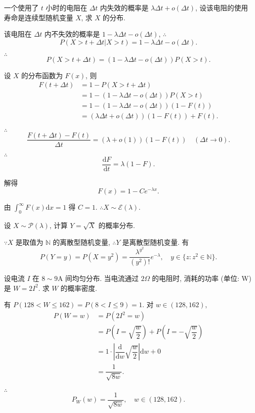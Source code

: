 \documentclass{ctexart}
\begin{document}
\addtocounter{exercise}{3}
\begin{exercise}%
    一个使用了 $t$ 小时的电阻在 $\Delta t$ 内失效的概率是 $\lambda\Delta t+o(\Delta t)$, 设该电阻的使用寿命是连续型随机变量 $X$, 求 $X$ 的分布.
\end{exercise}
\begin{solution}
    该电阻在 $\Delta t$ 内不失效的概率是 $1-\lambda\Delta t-o(\Delta t)$, $\therefore$
    \[P(X>t+\Delta t|X>t)=1-\lambda\Delta t-o(\Delta t).\]

    $\therefore$
    \[P(X>t+\Delta t)=(1-\lambda\Delta t-o(\Delta t))P(X>t).\]

    设 $X$ 的分布函数为 $F(x)$, 则
    \begin{align*}
        F(t+\Delta t) & =1-P(X>t+\Delta t) \\
        & =1-(1-\lambda\Delta t-o(\Delta t))P(X>t) \\
        & =1-(1-\lambda\Delta t-o(\Delta t))(1-F(t)) \\
        & =(\lambda\Delta t+o(\Delta t))(1-F(t))+F(t).
    \end{align*}

    $\therefore$
    \[\dfrac{F(t+\Delta t)-F(t)}{\Delta t}=(\lambda+o(1))(1-F(t))\quad(\Delta t\to0).\]

    $\therefore$
    \[\dfrac{\mathrm{d}F}{\mathrm{d}t}=\lambda(1-F).\]

    解得
    \[F(x)=1-Ce^{-\lambda x}.\]

    由 $\int_0^\infty F(x)\mathrm{d}x=1$ 得 $C=1$. $\therefore X\sim\mathcal{E}(\lambda)$.
\end{solution}
\begin{exercise}%
    设 $X\sim\mathcal{P}(\lambda)$, 计算 $Y=\sqrt{X}$ 的概率分布.
\end{exercise}
\begin{solution}
    $\because X$ 是取值为 $\mathbb{N}$ 的离散型随机变量, $\therefore Y$ 是离散型随机变量. 有
    \[P(Y=y)=P(X=y^2)=\dfrac{\lambda^{y^2}}{(y^2)!}e^{-\lambda},\quad y\in\{z:z^2\in\mathbb{N}\}.\]
\end{solution}
\begin{exercise}%
    设电流 $I$ 在 $8\sim 9\text{A}$ 间均匀分布. 当电流通过 $2\Omega$ 的电阻时, 消耗的功率 (单位: W) 是 $W=2I^2$. 求 $W$ 的概率密度.
\end{exercise}
\begin{solution}
    有 $P(128<W\leq162)=P(8<I\leq9)=1$. 对 $w\in(128,162)$,
    \begin{align*}
        P(W=w) & =P(2I^2=w) \\
        & =P\left(I=\sqrt{\dfrac{w}{2}}\right)+P\left(I=-\sqrt{\dfrac{w}{2}}\right) \\
        & =1\cdot\left|\dfrac{\mathrm{d}}{\mathrm{d}w}\sqrt{\dfrac{w}{2}}\right|\mathrm{d}w+0 \\
        & =\dfrac{1}{\sqrt{8w}}.
    \end{align*}

    $\therefore$
    \[P_W(w)=\dfrac{1}{\sqrt{8w}},\quad w\in(128,162).\]
\end{solution}
\end{document}
